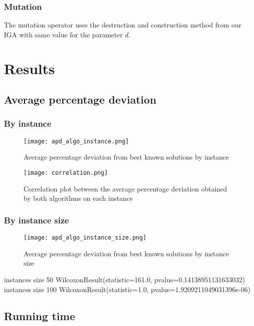 \documentclass[a4paper,10pt]{article}
\begin{document}
		\subsubsection{Mutation}
			The mutation operator uses the destruction and construction method from our IGA with same value for the parameter $d$.

\section{Results}

	\subsection{Average percentage deviation}

		\subsubsection{By instance}

		\begin{figure}[H]
			\centering
			\caption{Average percentage deviation from best known solutions by instance}
			\texttt{[image: apd\_algo\_instance.png]}
		\end{figure}


		\begin{figure}[H]
			\centering
			\caption{Correlation plot between the average percentage deviation obtained by both algorithms on each instance}
			\texttt{[image: correlation.png]}
		\end{figure}


		\subsubsection{By instance size}

		\begin{figure}[H]
			\centering
			\caption{Average percentage deviation from best known solutions by instance size}
			\texttt{[image: apd\_algo\_instance\_size.png]}
		\end{figure}

		instances size 50
		WilcoxonResult(statistic=161.0, pvalue=0.14138951131633032)
		instances size 100
		WilcoxonResult(statistic=1.0, pvalue=1.9209211049031396e-06)

	\subsection{Running time}
\end{document}
